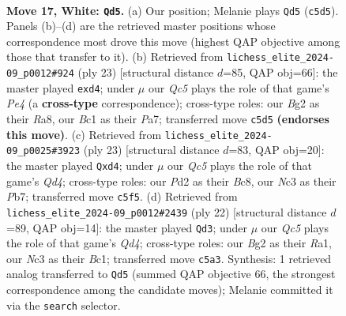 \documentclass[11pt]{article}
\begin{document}
\clearpage

\begin{figure}[p]\centering
\begin{subfigure}{0.46\textwidth}\centering
\resizebox{\linewidth}{!}{%
\newchessgame
\chessboard[
  setfen={r1bqr2k/pp1pppbp/3n4/2Q5/2P5/2N2N2/PP1P1PBP/R1B2RK1 w - - 1 17},
  showmover=false,
  pgfstyle=straightmove, color=movearrow, markmove={c5-d5}
]}
\caption{}
\end{subfigure}\hfill
\begin{subfigure}{0.46\textwidth}\centering
\resizebox{\linewidth}{!}{%
\newchessgame
\chessboard[
  setfen={r1b2rk1/pp2bppp/5n2/3qp3/3NN3/3B3P/PPP1QPP1/R1B2RK1 b - - 0 12},
  showmover=false,
  pgfstyle=straightmove, color=movearrow, markmove={e5-d4}
]}
\caption{}
\end{subfigure}
\\[4pt]
\begin{subfigure}{0.46\textwidth}\centering
\resizebox{\linewidth}{!}{%
\newchessgame
\chessboard[
  setfen={r1b2rk1/1p2bppp/4pn2/p2q4/2NQ4/4P3/PP2BPPP/R1B2RK1 b - - 0 12},
  showmover=false,
  pgfstyle=straightmove, color=movearrow, markmove={d5-d4}
]}
\caption{}
\end{subfigure}\hfill
\begin{subfigure}{0.46\textwidth}\centering
\resizebox{\linewidth}{!}{%
\newchessgame
\chessboard[
  setfen={r1b2rk1/ppqpnppp/8/1B2b3/3QP3/2N4P/PP3PP1/R1B2RK1 w - - 1 12},
  showmover=false,
  pgfstyle=straightmove, color=movearrow, markmove={d4-d3}
]}
\caption{}
\end{subfigure}
\caption{\textbf{Move 17, White: \texttt{Qd5}.} (a) Our position; Melanie plays \texttt{Qd5} (\texttt{c5d5}). Panels (b)--(d) are the retrieved master positions whose correspondence most drove this move (highest QAP objective among those that transfer to it). (b) Retrieved from \texttt{lichess\_elite\_2024-09\_p0012\#924} (ply 23) [structural distance $d$=85, QAP obj=66]: the master played \texttt{exd4}; under $\mu$ our \emph{Qc5} plays the role of that game's \emph{Pe4} (a \textbf{cross-type} correspondence); cross-type roles: our \emph{B}g2 as their \emph{R}a8, our \emph{B}c1 as their \emph{P}a7; transferred move \texttt{c5d5} \textbf{(endorses this move)}. (c) Retrieved from \texttt{lichess\_elite\_2024-09\_p0025\#3923} (ply 23) [structural distance $d$=83, QAP obj=20]: the master played \texttt{Qxd4}; under $\mu$ our \emph{Qc5} plays the role of that game's \emph{Qd4}; cross-type roles: our \emph{P}d2 as their \emph{B}c8, our \emph{N}c3 as their \emph{P}b7; transferred move \texttt{c5f5}. (d) Retrieved from \texttt{lichess\_elite\_2024-09\_p0012\#2439} (ply 22) [structural distance $d$=89, QAP obj=14]: the master played \texttt{Qd3}; under $\mu$ our \emph{Qc5} plays the role of that game's \emph{Qd4}; cross-type roles: our \emph{B}g2 as their \emph{R}a1, our \emph{N}c3 as their \emph{B}c1; transferred move \texttt{c5a3}. Synthesis: 1 retrieved analog transferred to \texttt{Qd5} (summed QAP objective 66, the strongest correspondence among the candidate moves); Melanie committed it via the \texttt{search} selector.}
\label{fig:thought-m32}
\end{figure}
\end{document}
